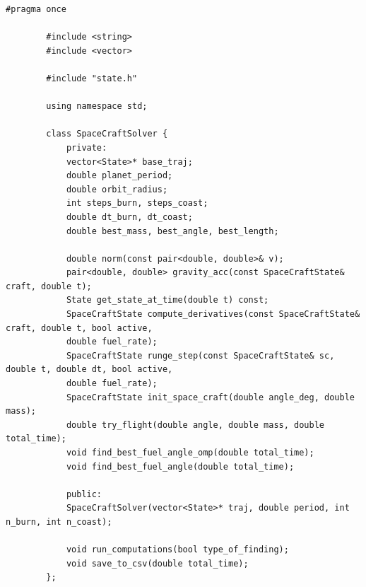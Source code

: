 \documentclass[14pt,a4paper]{extarticle}
\theoremstyle{plain}
\begin{document}
	\begin{lstlisting}[title=spacecraftSolver.h, gobble=16, breaklines=true, breakatwhitespace=true]
		#pragma once
		
		#include <string>
		#include <vector>
		
		#include "state.h"
		
		using namespace std;
		
		class SpaceCraftSolver {
			private:
			vector<State>* base_traj;
			double planet_period;
			double orbit_radius;
			int steps_burn, steps_coast;
			double dt_burn, dt_coast;
			double best_mass, best_angle, best_length;
			
			double norm(const pair<double, double>& v);
			pair<double, double> gravity_acc(const SpaceCraftState& craft, double t);
			State get_state_at_time(double t) const;
			SpaceCraftState compute_derivatives(const SpaceCraftState& craft, double t, bool active,
			double fuel_rate);
			SpaceCraftState runge_step(const SpaceCraftState& sc, double t, double dt, bool active,
			double fuel_rate);
			SpaceCraftState init_space_craft(double angle_deg, double mass);
			double try_flight(double angle, double mass, double total_time);
			void find_best_fuel_angle_omp(double total_time);
			void find_best_fuel_angle(double total_time);
			
			public:
			SpaceCraftSolver(vector<State>* traj, double period, int n_burn, int n_coast);
			
			void run_computations(bool type_of_finding);
			void save_to_csv(double total_time);
		};	
	\end{lstlisting}
	
\end{document}

